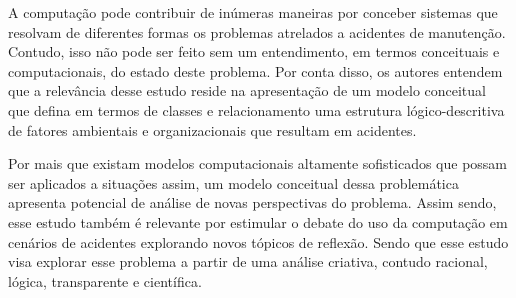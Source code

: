 A computação pode contribuir de inúmeras maneiras por conceber sistemas que resolvam de diferentes formas os problemas atrelados a acidentes de manutenção. Contudo, isso não pode ser feito sem um entendimento, em termos conceituais e computacionais, do estado deste problema. Por conta disso, os autores entendem que a relevância desse estudo reside na apresentação de um modelo conceitual que defina em termos de classes e relacionamento uma estrutura lógico-descritiva de fatores ambientais e organizacionais que resultam em acidentes. 

Por mais que existam modelos computacionais altamente sofisticados que possam ser aplicados a situações assim, um modelo conceitual dessa problemática apresenta potencial de análise de novas perspectivas do problema. Assim sendo, esse estudo também é relevante por estimular o debate do uso da computação em cenários de acidentes explorando novos tópicos de reflexão. Sendo que esse estudo visa explorar esse problema a partir de uma análise criativa, contudo racional, lógica, transparente e científica. 
